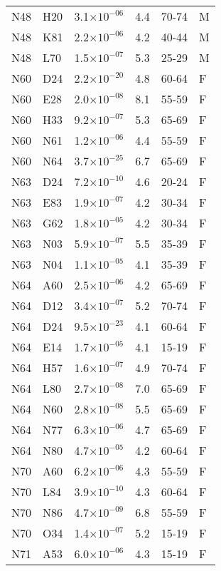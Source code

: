 \begin{longtable}{lllrll}
   N48 & H20 & 3.1$\times10^{-06}$ & 4.4 & 70-74 & M \\ 
   N48 & K81 & 2.2$\times10^{-06}$ & 4.2 & 40-44 & M \\ 
   N48 & L70 & 1.5$\times10^{-07}$ & 5.3 & 25-29 & M \\ 
   N60 & D24 & 2.2$\times10^{-20}$ & 4.8 & 60-64 & F \\ 
   N60 & E28 & 2.0$\times10^{-08}$ & 8.1 & 55-59 & F \\ 
   N60 & H33 & 9.2$\times10^{-07}$ & 5.3 & 65-69 & F \\ 
   N60 & N61 & 1.2$\times10^{-06}$ & 4.4 & 55-59 & F \\ 
   N60 & N64 & 3.7$\times10^{-25}$ & 6.7 & 65-69 & F \\ 
   N63 & D24 & 7.2$\times10^{-10}$ & 4.6 & 20-24 & F \\ 
   N63 & E83 & 1.9$\times10^{-07}$ & 4.2 & 30-34 & F \\ 
   N63 & G62 & 1.8$\times10^{-05}$ & 4.2 & 30-34 & F \\ 
   N63 & N03 & 5.9$\times10^{-07}$ & 5.5 & 35-39 & F \\ 
   N63 & N04 & 1.1$\times10^{-05}$ & 4.1 & 35-39 & F \\ 
   N64 & A60 & 2.5$\times10^{-06}$ & 4.2 & 65-69 & F \\ 
   N64 & D12 & 3.4$\times10^{-07}$ & 5.2 & 70-74 & F \\ 
   N64 & D24 & 9.5$\times10^{-23}$ & 4.1 & 60-64 & F \\ 
   N64 & E14 & 1.7$\times10^{-05}$ & 4.1 & 15-19 & F \\ 
   N64 & H57 & 1.6$\times10^{-07}$ & 4.9 & 70-74 & F \\ 
   N64 & L80 & 2.7$\times10^{-08}$ & 7.0 & 65-69 & F \\ 
   N64 & N60 & 2.8$\times10^{-08}$ & 5.5 & 65-69 & F \\ 
   N64 & N77 & 6.3$\times10^{-06}$ & 4.7 & 65-69 & F \\ 
   N64 & N80 & 4.7$\times10^{-05}$ & 4.2 & 60-64 & F \\ 
   N70 & A60 & 6.2$\times10^{-06}$ & 4.3 & 55-59 & F \\ 
   N70 & L84 & 3.9$\times10^{-10}$ & 4.3 & 60-64 & F \\ 
   N70 & N86 & 4.7$\times10^{-09}$ & 6.8 & 55-59 & F \\ 
   N70 & O34 & 1.4$\times10^{-07}$ & 5.2 & 15-19 & F \\ 
   N71 & A53 & 6.0$\times10^{-06}$ & 4.3 & 15-19 & F \\ 

\end{longtable}
